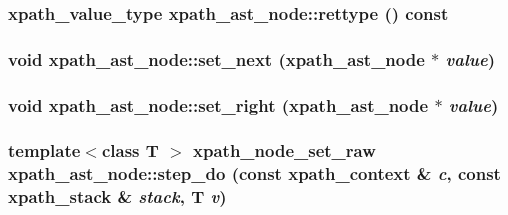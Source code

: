 \label{classxpath__ast__node_a60fddea92b095c2b8705f12f7309e6aa}
\hypertarget{classxpath__ast__node_a2c3598521141ed4b763fe6c4f852234f}{
\subsubsection[{rettype}]{\setlength{\rightskip}{0pt plus 5cm}xpath\_\-value\_\-type xpath\_\-ast\_\-node::rettype () const}}
\label{classxpath__ast__node_a2c3598521141ed4b763fe6c4f852234f}
\hypertarget{classxpath__ast__node_a2764184d076834284eb3ff3182b845cc}{
\subsubsection[{set\_\-next}]{\setlength{\rightskip}{0pt plus 5cm}void xpath\_\-ast\_\-node::set\_\-next ({\bf xpath\_\-ast\_\-node} $\ast$ {\em value})}}
\label{classxpath__ast__node_a2764184d076834284eb3ff3182b845cc}
\hypertarget{classxpath__ast__node_afe044146db852b7d4dbf188fd2ff6c75}{
\subsubsection[{set\_\-right}]{\setlength{\rightskip}{0pt plus 5cm}void xpath\_\-ast\_\-node::set\_\-right ({\bf xpath\_\-ast\_\-node} $\ast$ {\em value})}}
\label{classxpath__ast__node_afe044146db852b7d4dbf188fd2ff6c75}
\hypertarget{classxpath__ast__node_a326147ab8def5110e44deafd73b20393}{
\subsubsection[{step\_\-do}]{\setlength{\rightskip}{0pt plus 5cm}template$<$class T $>$ {\bf xpath\_\-node\_\-set\_\-raw} xpath\_\-ast\_\-node::step\_\-do (const {\bf xpath\_\-context} \& {\em c}, \/  const {\bf xpath\_\-stack} \& {\em stack}, \/  T {\em v})}}
